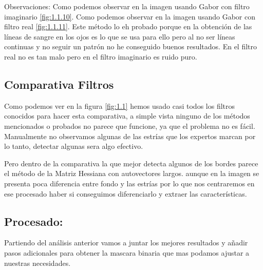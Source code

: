 Observaciones:
Como podemos observar en la imagen usando Gabor con filtro imaginario \ref{fig:1.1.10}.
Como podemos observar en la imagen usando Gabor con filtro real \ref{fig:1.1.11}.
Este método lo eh probado porque en la obtención de las líneas de sangre en los ojos es lo que se usa para ello pero al no ser líneas continuas y no seguir un patrón no he conseguido buenos resultados. En el filtro real no es tan malo pero en el filtro imaginario es ruido puro.
\subsection{Comparativa Filtros}
Como podemos ver en la figura \ref{fig:1.1} hemos usado casi todos los filtros conocidos para hacer esta comparativa, a simple vista ninguno de los métodos mencionados o probados no parece que funcione, ya que el problema no es fácil.
Manualmente no observamos algunas de las estrías que los expertos marcan por lo tanto, detectar algunas sera algo efectivo.

Pero dentro de la comparativa la que mejor detecta algunos de los bordes parece el método de la Matriz Hessiana con autovectores largos. aunque en la imagen se presenta poca diferencia entre fondo y las estrías por lo que nos centraremos en ese procesado haber si conseguimos diferenciarlo y extraer las características.

\subsection{Procesado:}
Partiendo del análisis anterior vamos a juntar los mejores resultados y añadir pasos adicionales para obtener la mascara binaria que mas podamos ajustar a nuestras necesidades.


